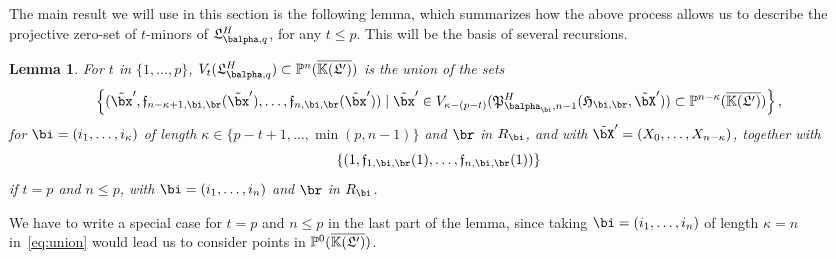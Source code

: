 \documentclass[12pt]{article}
\newtheorem{lemma}[definition]{Lemma}
\begin{document}
The main result we will use in this section is the following lemma,
which summarizes how the above process allows us to describe the
projective zero-set of $t$-minors of $\mathfrak{L}^H_{\balpha,q}$, for
any $t \le p$. This will be the basis of several recursions.
\begin{lemma}\label{lemma:union}
  For $t$ in $\{1,\dots,p\}$, $V_t(\mathfrak{L}^H_{\balpha,q}) \subset \P^{n}(\KKGpbar)$ is the
  union of the sets
 \begin{align}\label{eq:union}
 \left \{(\tilde\bx',\mathfrak{f}_{n-\kappa+1,\bi,\br}(\tilde\bx'),\dots,\mathfrak{f}_{n,\bi,\br}(\tilde\bx')) \mid \tilde\bx' \in
  V_{\kappa-(p-t)}(\mathfrak{P}^H_{\balpha_\bi,n-1}(\mathfrak{H}_{\bi,\br},\tilde\bX')) \subset \P^{n-\kappa}(\KKGpbar)\right \},   
 \end{align}
 for $\bi=(i_1,\dots,i_\kappa)$ of length $\kappa \in \{p-t+1,\dots,\min(p,n-1)\}$ and $\br$ in $R_\bi$,
 and with $\tilde\bX'=(X_0,\dots,X_{n-\kappa})$, together with
 $$\left \{
 (1,\mathfrak{f}_{1,\bi,\br}(1),\dots,\mathfrak{f}_{n,\bi,\br}(1))\right
 \}$$ if $t=p$ and $n \le p$, with $\bi=(i_1,\dots,i_n)$ and $\br$ in $R_\bi$.
\end{lemma}
\noindent We have to write a special case for $t=p$ and $n \le p$ in the last part of the lemma,
since taking $\bi=(i_1,\dots,i_n)$ of length $\kappa=n$
in~\eqref{eq:union} would lead us to consider points in $\mathbb{P}^0(\overline{\mathbb{K}(\mathfrak{L}')})$.
\end{document}
